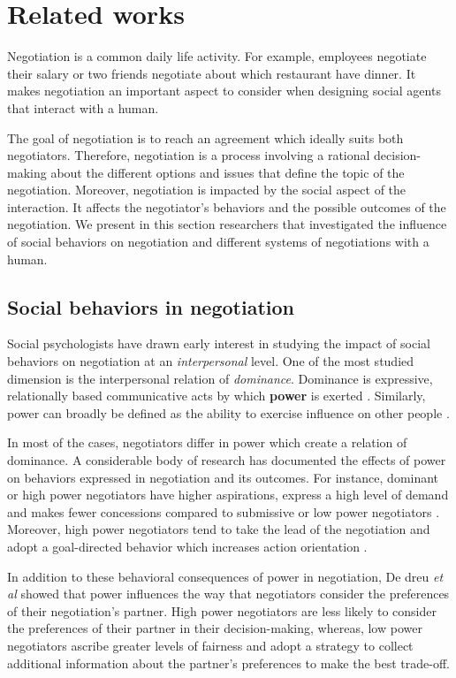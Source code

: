 \documentclass[runningheads,a4paper]{llncs}
\begin{document}
	
	\section{Related works}	
	Negotiation is a common daily life activity. For example, employees negotiate their salary or two friends negotiate about which restaurant have dinner. It makes negotiation an important aspect to consider when designing social agents that interact with a human.
	
	The goal of negotiation is to reach an agreement which ideally suits both negotiators. Therefore, negotiation is a process involving a rational decision-making about the different options and issues that define the topic of the negotiation. Moreover, negotiation is impacted by the social aspect of the interaction. It affects the negotiator's behaviors and the possible outcomes of the negotiation. We present in this section researchers that investigated the influence of social behaviors on negotiation and different systems of negotiations with a human.
	
	\subsection{Social behaviors in negotiation}
	
	Social psychologists have drawn early interest in studying the impact of social behaviors on negotiation at an \emph{interpersonal} level. One of the most studied dimension is the interpersonal relation of \emph{dominance}. Dominance is expressive, relationally based communicative acts by which \textbf{power} is exerted \cite{burgoonnonverbal}. Similarly, power can broadly be defined as the ability to exercise influence on other people \cite{van2006power}.
	
	
	In most of the cases, negotiators differ in power \cite{van2006power} which create a relation of dominance. A considerable body of research has documented the effects of power on behaviors expressed in negotiation and its outcomes. For instance, dominant or high power negotiators have higher aspirations, express a high level of demand and makes fewer concessions compared to submissive or low power negotiators \cite{de1995impact}. Moreover, high power negotiators tend to take the lead of the negotiation and adopt a goal-directed behavior which increases action orientation \cite{galinsky2003power}.
	
	In addition to these behavioral consequences of power in negotiation, De dreu  \textit{et al} \cite{de2004influence,fiske1993controlling} showed that power influences the way that negotiators consider the preferences of their negotiation's partner. High power negotiators are less likely to consider the preferences of their partner in their decision-making, whereas, low power negotiators ascribe greater levels of fairness and adopt a strategy to collect additional information about the partner's preferences \cite{de2004influence} to make the best trade-off.
	
\end{document}
